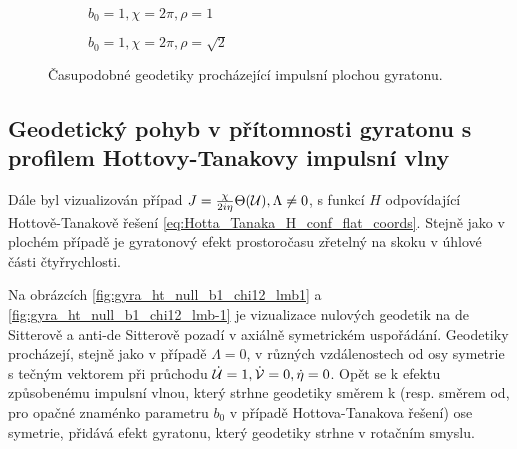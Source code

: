 \begin{figure}[ht]
    \centering
    \begin{subfigure}[b]{0.48\textwidth}
        \caption{$b_0=1, \chi=2\pi, \rho=1$}
    \end{subfigure}
    \begin{subfigure}[b]{0.48\textwidth}
        \caption{$b_0=1, \chi=2\pi, \rho=\sqrt{2}$} 
    \end{subfigure}
    \caption{Časupodobné geodetiky procházející impulsní plochou gyratonu.}
    \label{fig:gyra_flat_timelike_b1_chi1_2_vxy_skewed}
\end{figure}

\subsection{Geodetický pohyb v přítomnosti gyratonu s profilem Hottovy-Tanakovy impulsní vlny}
Dále byl vizualizován případ $J = \frac{\chi}{2 i \eta} \Theta(\mathcal{U}), \Lambda \not= 0$, s funkcí $H$ odpovídající
Hottově-Tanakově řešení \eqref{eq:Hotta_Tanaka_H_conf_flat_coords}.
Stejně jako v plochém případě je gyratonový efekt prostoročasu zřetelný na skoku v úhlové části čtyřrychlosti.

Na obrázcích \ref{fig:gyra_ht_null_b1_chi12_lmb1} a \ref{fig:gyra_ht_null_b1_chi12_lmb-1} je vizualizace nulových geodetik na de Sitterově a anti-de Sitterově pozadí v axiálně symetrickém uspořádání.
Geodetiky procházejí, stejně jako v případě $\Lambda = 0$, v různých vzdálenostech od osy symetrie s tečným vektorem při průchodu $\dot{\mathcal{U}} = 1, \dot{\mathcal{V}}=0, \dot\eta=0$.
Opět se k efektu způsobenému impulsní vlnou, který strhne geodetiky směrem k (resp. směrem od, pro opačné znaménko parametru $b_0$ v případě Hottova-Tanakova řešení) ose symetrie, přidává efekt gyratonu,
který geodetiky strhne v rotačním smyslu.

